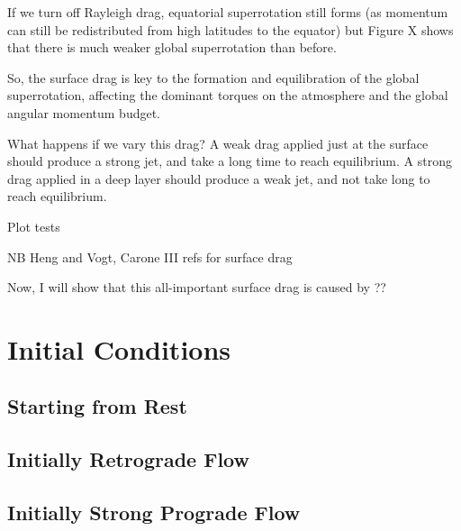 If we turn off Rayleigh drag, equatorial superrotation still forms (as momentum can still be redistributed from high latitudes to the equator) but Figure X shows that there is much weaker global superrotation than before.

So, the surface drag is key to the formation and equilibration of the global superrotation, affecting the dominant torques on the atmosphere and the global angular momentum budget.

What happens if we vary this drag? A weak drag applied just at the surface should produce a strong jet, and take a long time to reach equilibrium. A strong drag applied in a deep layer should produce a weak jet, and not take long to reach equilibrium.

Plot tests


NB Heng and Vogt, Carone III refs for surface drag



Now, I will show that this all-important surface drag is caused by ??






\section{Initial Conditions}


\subsection*{Starting from Rest}

\subsection*{{Initially Retrograde Flow}}

\subsection*{Initially Strong Prograde Flow}






